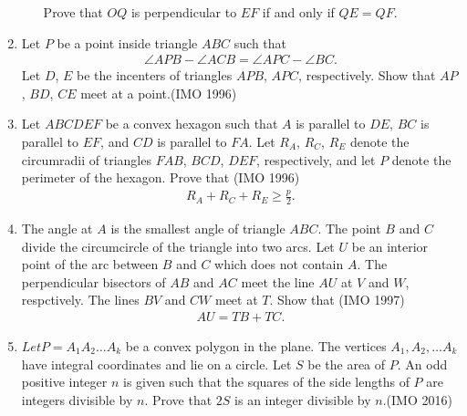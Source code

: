 \begin{enumerate}[label=\thesubsection.\arabic*,ref=\thesubsection.\theenumi]
\begin{enumerate}
		 Prove that $OQ$ is perpendicular to $EF$ if and only if $QE=QF$.    
\end{enumerate}
%
%		
%	
%
\item Let $P$ be a point inside triangle $ABC$ such     that                                         
\begin{align*}                                      
	\angle{APB}-\angle{ACB}=\angle{APC}-\angle{ BC}.
 \end{align*}                                       
Let $D$, $E$ be the incenters of triangles $APB$, $APC$, respectively. Show that $AP$, $BD$, $CE$ meet at a point.\hfill(IMO  1996)
\item Let $ABCDEF$ be a convex hexagon such that $A$ is parallel to $DE$, $BC$ is parallel to $EF$, and $CD$ is parallel to $FA$. Let $R_A$, $R_C$, $R_E$ denote the circumradii of triangles $FAB$, $BCD$, $DEF$, respectively, and let $P$ denote the perimeter of the hexagon. Prove that            \hfill(IMO  1996)
\begin{align*}                                            R_A+R_C+R_E\geq\frac{p}{2}.  
\end{align*}
\item The angle at $A$ is the smallest angle of triangle $ABC$. The point $B$ and $C$ divide the circumcircle of the triangle into two arcs. Let $U$ be an interior point of the arc between $B$ and $C$ which does not contain $A$. The perpendicular bisectors of  $AB$ and $AC$ meet the line $AU$ at $V$ and $W$, respctively. The lines $BV$ and $CW$ meet at $T$. Show that
\hfill(IMO  1997)
 \begin{align*}
AU=TB+TC.
 \end{align*}                                   
\item $Let P=A_1A_2 \dots A_k$ be a convex polygon in the plane. The vertices $A_1, A_2,\dots A_k $ have integral coordinates and lie on a circle. Let $S$ be the area of $P$. An odd positive integer $n$ is given such that the squares of the side lengths of $P$ are integers divisible by $n$. Prove that $2S$ is an integer divisible by $n$.\hfill(IMO  2016)

\end{enumerate}
